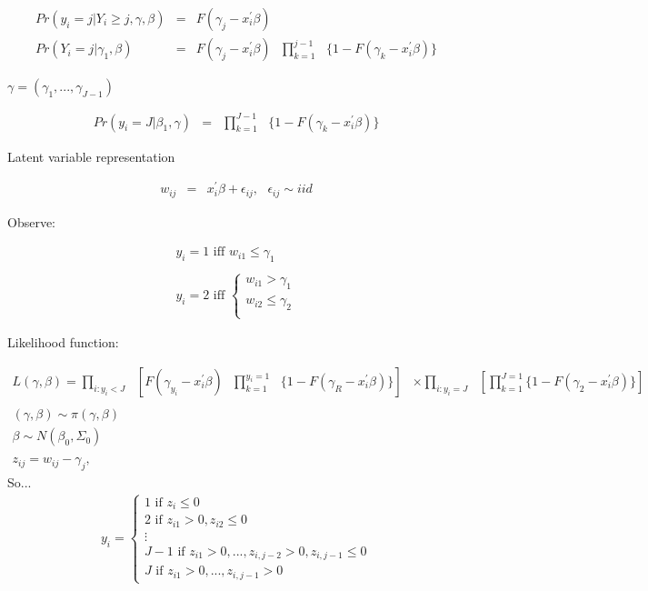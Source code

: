 \begin{eqnarray}
	Pr(y_{i}={j} | Y_{i} \geq {j}, \gamma, \beta) &=& F(\gamma_{j} - x_{i}^{'}\beta) \nonumber \\
	Pr(Y_{i}={j}|\gamma_{1},\beta) &=& F(\gamma_{j} - x_{i}^{'}\beta)\text{ }\prod^{j-1}_{k=1}\text{ }\{1-F(\gamma_{k}-x_{i}^{'}\beta)\} \nonumber
\end{eqnarray}

$\gamma = (\gamma_{1},...,\gamma_{J-1})$

\begin{eqnarray}
	Pr(y_{i}=J|\beta_{1},\gamma) &=&\text{}\prod^{J-1}_{k=1}\text{ }\{1-F(\gamma_{k}-x_{i}^{'}\beta)\} \nonumber
\end{eqnarray}

Latent variable representation

\begin{eqnarray}
	w_{ij} &=& x_{i}^{'}\beta+\epsilon_{ij},\text{ }\epsilon_{ij} \sim iid \nonumber
\end{eqnarray}

Observe:

\begin{eqnarray}
	y_{i} = 1\text{ iff } w_{i1} \leq \gamma_{1} \nonumber \\
	\nonumber \\
	y_{i} = 2\text{ iff }
	\begin{cases}
	w_{i1} > \gamma_{1} \nonumber \\
	w_{i2} \leq \gamma_{2} \nonumber \\
\end{cases}
\end{eqnarray}

Likelihood function:

\begin{eqnarray}
	L(\gamma,\beta) = \prod_{i\colon y_{i}<J}\text{ }[ F(\gamma_{y_{i}} - x_{i}^{'}\beta)\text{ }\prod_{k=1}^{y_{i}=1}\text{ }\{1-F(\gamma_{R}-x_{i}^{'}\beta)\}] &\times \displaystyle \prod_{i\colon y_{i}=J}\text{ }[\prod_{k=1}^{J=1} \{1-F(\gamma_{2} - x_{i}^{'}\beta)\}] \nonumber \\
	\nonumber \\
	(\gamma,\beta) \sim \pi (\gamma,\beta) & \nonumber \\
	\beta \sim N(\beta_{0},\Sigma_{0}) & \nonumber \\
	\nonumber \\
	z_{ij} = w_{ij} - \gamma_{j}, & \nonumber
	\end{eqnarray}
	So...
	\begin{eqnarray}
	y_{i} =
	\begin{cases}
	1\text{ if }z_{i} \leq 0 \nonumber \\
	2\text{ if }z_{i1} > 0, z_{i2} \leq 0 \nonumber \\
	\vdots \nonumber \\
	J-1\text{ if }z_{i1} > 0,...,z_{i,j-2}>0,z_{i,j-1}\leq0 \nonumber \\
	J\text{ if }z_{i1}>0,...,z_{i,j-1}>0
\end{cases}
\end{eqnarray}

